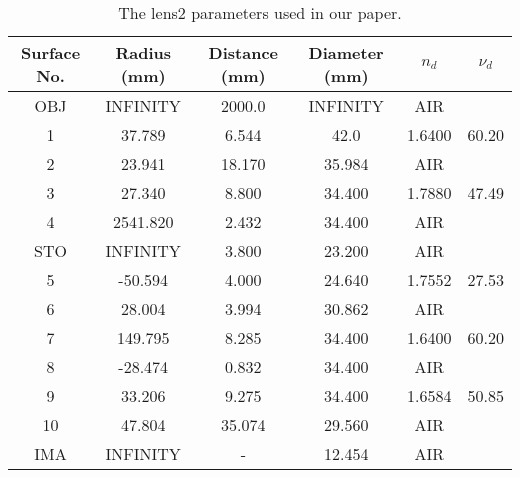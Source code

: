 \begin{table*}[htp]
\centering
\caption{The lens2 parameters used in our paper.}
\label{tab:lens2_param}
\begin{tabular}{cccccc}
\toprule
Surface No. & Radius (mm) & Distance (mm) & Diameter (mm) & $n_d$ & $\nu_d$ \\
\toprule
OBJ & INFINITY & 2000.0 & INFINITY & AIR &  \\
1 & 37.789 & 6.544 & 42.0 & 1.6400 & 60.20 \\
2 & 23.941 & 18.170 & 35.984 & AIR & \\
3 & 27.340 & 8.800 & 34.400 & 1.7880 & 47.49 \\
4 & 2541.820 & 2.432 & 34.400 & AIR & \\
STO & INFINITY & 3.800 & 23.200 & AIR & \\
5 & -50.594 & 4.000 & 24.640 & 1.7552 & 27.53 \\
6 & 28.004 & 3.994 & 30.862 & AIR & \\
7 & 149.795 & 8.285 & 34.400 &  1.6400 & 60.20 \\
8 & -28.474 & 0.832 & 34.400 & AIR & \\
9 & 33.206 & 9.275 & 34.400 &  1.6584 & 50.85 \\
10 & 47.804 & 35.074 & 29.560 & AIR & \\
IMA & INFINITY & - & 12.454 & AIR & \\
\bottomrule
\end{tabular}
\end{table*}